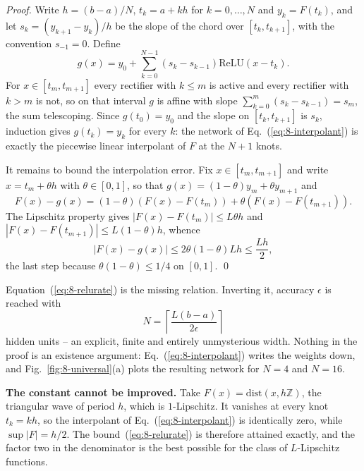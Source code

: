 \begin{proof}
Write $h=(b-a)/N$, $t_k=a+kh$ for $k=0,\dots,N$ and $y_k=F(t_k)$, and let
$s_k=(y_{k+1}-y_k)/h$ be the slope of the chord over $[t_k,t_{k+1}]$, with the
convention $s_{-1}=0$.  Define
\begin{equation}
  g(x) = y_0 + \sum_{k=0}^{N-1}\left(s_k-s_{k-1}\right)
              \mathrm{ReLU}\!\left(x-t_k\right).
  \label{eq:8-interpolant}
\end{equation}
For $x\in[t_m,t_{m+1}]$ every rectifier with $k\le m$ is active and every
rectifier with $k>m$ is not, so on that interval $g$ is affine with slope
$\sum_{k=0}^{m}(s_k-s_{k-1})=s_m$, the sum telescoping.  Since $g(t_0)=y_0$ and
the slope on $[t_k,t_{k+1}]$ is $s_k$, induction gives $g(t_k)=y_k$ for every
$k$: the network of Eq.~(\ref{eq:8-interpolant}) is exactly the piecewise
linear interpolant of $F$ at the $N+1$ knots.

It remains to bound the interpolation error.  Fix $x\in[t_m,t_{m+1}]$ and write
$x=t_m+\theta h$ with $\theta\in[0,1]$, so that
$g(x)=(1-\theta)y_m+\theta y_{m+1}$ and
\begin{equation}
  F(x)-g(x) = (1-\theta)\left(F(x)-F(t_m)\right)
            + \theta\left(F(x)-F(t_{m+1})\right).
  \label{eq:8-interperror}
\end{equation}
The Lipschitz property gives $|F(x)-F(t_m)|\le L\theta h$ and
$|F(x)-F(t_{m+1})|\le L(1-\theta)h$, whence
\begin{equation}
  \left|F(x)-g(x)\right| \le 2\theta(1-\theta)Lh \le \frac{Lh}{2},
  \label{eq:8-interpbound}
\end{equation}
the last step because $\theta(1-\theta)\le1/4$ on $[0,1]$.
\qed
\end{proof}

Equation~(\ref{eq:8-relurate}) is the missing relation.  Inverting it, accuracy
$\epsilon$ is reached with
\begin{equation}
  N = \left\lceil\frac{L(b-a)}{2\epsilon}\right\rceil
  \label{eq:8-widthforeps}
\end{equation}
hidden units -- an explicit, finite and entirely unmysterious width.  Nothing
in the proof is an existence argument: Eq.~(\ref{eq:8-interpolant}) writes the
weights down, and Fig.~\ref{fig:8-universal}(a) plots the resulting network for
$N=4$ and $N=16$.

\begin{notebox}
\textbf{The constant cannot be improved.}  Take
$F(x)=\mathrm{dist}(x,h\mathbb{Z})$, the triangular wave of period $h$, which is
$1$-Lipschitz.  It vanishes at every knot $t_k=kh$, so the interpolant of
Eq.~(\ref{eq:8-interpolant}) is identically zero, while $\sup|F|=h/2$.  The
bound~(\ref{eq:8-relurate}) is therefore attained exactly, and the factor two
in the denominator is the best possible for the class of $L$-Lipschitz
functions.
\end{notebox}

